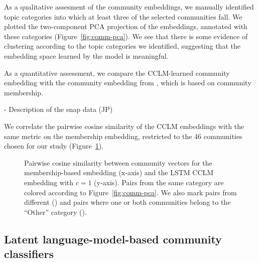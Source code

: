 \documentclass[11pt,a4paper]{article}
\begin{document}
As a qualitative assesment of the community embeddings, 
we manually identified topic categories into which at least three
of the selected communities fall. 
We plotted the two-component PCA projection of the embeddings,
annotated with these categories (Figure~\ref{fig:comm-pca}).
We see that there is some evidence of clustering according to
the topic categories we identified,
suggesting that the embedding space learned by the model is meaningful.

\begin{figure*}
\caption{Community embedding PCA of the best LSTM (left, $c=1$) and transformer (right, $c=3$) models.}
\label{fig:comm-pca}
\end{figure*}

As a quantitative assessment,
we compare the CCLM-learned community embedding with the community embedding from \citet{Kumar2018},
which is based on community membership. 

- Description of the snap data (JP)

We correlate the pairwise cosine similarity of the
CCLM embeddings with the same metric on the membership embedding,
restricted to the 46 communities chosen for our study
(Figure~\ref{fig:pairwise-comm-sim}).

\begin{figure}
  \caption{Pairwise cosine similarity between community vectors for 
    the membership-based embedding (x-axis) and
  the LSTM CCLM embedding with $c=1$ (y-axis). 
  Pairs from the same category are colored according to Figure~\ref{fig:comm-pca}.
  We also mark pairs from different (\texttimes) and pairs where one or both
  communities belong to the ``Other'' category (\textbigcircle).
  }
  \label{fig:pairwise-comm-sim}
\end{figure}

\begin{table}
  \centering
  
  \caption{Pearson's r between the pairwise similarity of community vectors
  in the CCLM models and the membership-based embedding of \citet{Kumar2018}.
  ($p<0.001$ for all models).
  }
  \label{tab:pairwise-comm-sim}
\end{table}

\subsection{Latent language-model-based community classifiers}
\end{document}
